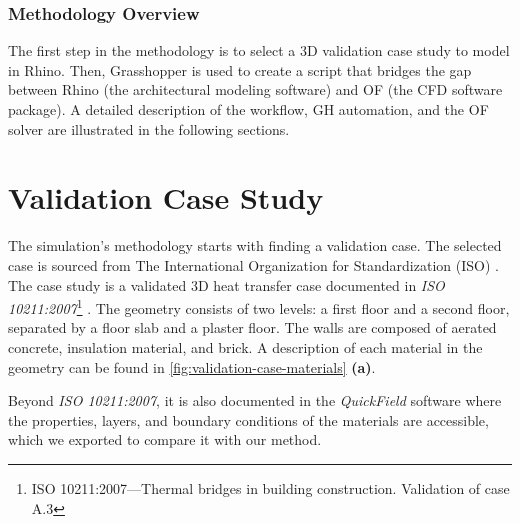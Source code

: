 \subsubsection{Methodology Overview}
The first step in the methodology is to select a 3D validation case study to model in Rhino. Then, Grasshopper is used to create a script that bridges the gap between Rhino (the architectural modeling software) and  \gls{OF} (the CFD software package). A detailed description of the workflow, \gls{GH} automation, and the \gls{OF} solver are illustrated in the following sections.





\section{Validation Case Study}
The simulation's methodology starts with finding a validation case. The selected case is sourced from The International Organization for Standardization (ISO) \cite{ISO}. The case study is a validated 3D heat transfer case documented in \textit{ISO 10211:2007}\footnote{ISO 10211:2007---Thermal bridges in building construction. Validation of case A.3} \cite{ISO}. 
The geometry consists of two levels: a first floor and a second floor, separated by a floor slab and a plaster floor. The  walls are composed of aerated concrete, insulation material, and brick.
A description of each material in the geometry can be found in \ref{fig:validation-case-materials} \textbf{(a)}.

Beyond \textit{ISO 10211:2007}, it is also documented in the \textit{QuickField} software where the properties, layers, and boundary conditions of the materials are accessible, which we exported to compare it with our method. 

   


